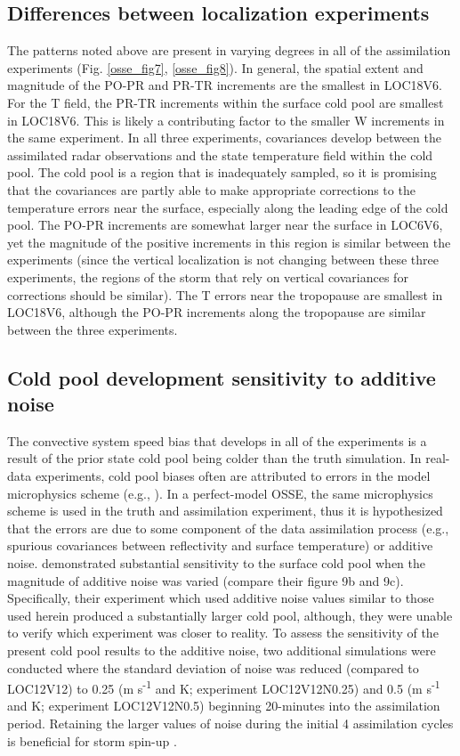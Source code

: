\subsection{Differences between localization experiments}
The patterns noted above are present in varying degrees in all of the assimilation experiments (Fig. \ref{osse_fig7}, \ref{osse_fig8}). In general, the spatial extent and magnitude of the PO-PR and PR-TR increments are the smallest in LOC18V6. For the T field, the PR-TR increments within the surface cold pool are smallest in LOC18V6. This is likely a contributing factor to the smaller W increments in the same experiment. In all three experiments, covariances develop between the assimilated radar observations and the state temperature field within the cold pool. The cold pool is a region that is inadequately sampled, so it is promising that the covariances are partly able to make appropriate corrections to the temperature errors near the surface, especially along the leading edge of the cold pool. The PO-PR increments are somewhat larger near the surface in LOC6V6, yet the magnitude of the positive increments in this region is similar between the experiments (since the vertical localization is not changing between these three experiments, the regions of the storm that rely on vertical covariances for corrections should be similar). The T errors near the tropopause are smallest in LOC18V6, although the PO-PR increments along the tropopause are similar between the three experiments.

\subsection{Cold pool development sensitivity to additive noise}
\label{addnoisesection}
The convective system speed bias that develops in all of the experiments is a result of the prior state cold pool being colder than the truth simulation. In real-data experiments, cold pool biases often are attributed to errors in the model microphysics scheme (e.g., \citealt{dowelletal11}). In a perfect-model OSSE, the same microphysics scheme is used in the truth and assimilation experiment, thus it is hypothesized that the errors are due to some component of the data assimilation process (e.g., spurious covariances between reflectivity and surface temperature) or additive noise. \citet{dowelletal11} demonstrated substantial sensitivity to the surface cold pool when the magnitude of additive noise was varied (compare their figure 9b and 9c). Specifically, their experiment which used additive noise values similar to those used herein produced a substantially larger cold pool, although, they were unable to verify which experiment was closer to reality. To assess the sensitivity of the present cold pool results to the additive noise, two additional simulations were conducted where the standard deviation of noise was reduced (compared to LOC12V12) to 0.25 (m s\textsuperscript{-1} and K; experiment LOC12V12N0.25) and 0.5 (m s\textsuperscript{-1} and K; experiment LOC12V12N0.5) beginning 20-minutes into the assimilation period. Retaining the larger values of noise during the initial 4 assimilation cycles is beneficial for storm spin-up \citep{dowellwicker09}.

